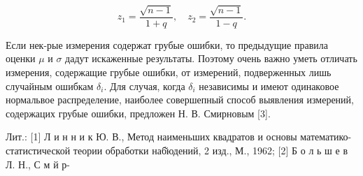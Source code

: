 \documentclass[10pt]{article}
\begin{document}
\[

z_{1}=\frac{\sqrt{n-1}}{1+q}, \quad z_{2}=\frac{\sqrt{n-1}}{1-q} .

\]



Если нек-рые измерения содержат грубые ошибки, то предыдущие правила оценки $\mu$ и $\sigma$ дадут искаженные результаты. Поэтому очень важно уметь отличать измерения, содержащие грубые ошибки, от измерений, подверженных лишь случайным ошибкам $\delta_{i}$. Для случая, когда $\delta_{i}$ независимы и имеют одинаковое нормальвое распределение, наиболее совершепный способ выявления измерений, содержацих грубые ошибки, предложен Н. В. Смирновым [3].



Лит.: [1] Л и н н и к Ю. В., Метод наименьших квадратов и основы математико-статистической теории обработки наб̆юдений, 2 изд., М., 1962; [2] Б о л ь ш е в Л. Н., С м й р-
\end{document}
